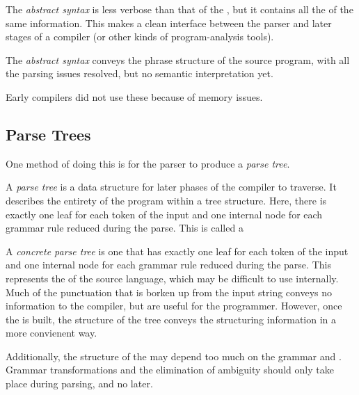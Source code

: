 \begin{definition}\label{def:Abstract_Syntax}
  The \emph{abstract syntax} is less verbose than that of the , but it contains all the of the same information.
  This makes a clean interface between the parser and later stages of a compiler (or other kinds of program-analysis tools).
  
  The \emph{abstract syntax} conveys the phrase structure of the source program, with all the parsing issues resolved, but no semantic interpretation yet.

  Early compilers did not use these because of memory issues.
\end{definition}

\subsection{Parse Trees}\label{subsec:Parse_Trees}
One method of doing this is for the parser to produce a \emph{parse tree}.
\begin{definition}\label{def:Parse_Tree}
  A \emph{parse tree} is a data structure for later phases of the compiler to traverse.
  It describes the entirety of the program within a tree structure.
  Here, there is exactly one leaf for each token of the input and one internal node for each grammar rule reduced during the parse.
  This is called a 
\end{definition}

\begin{definition}\label{def:Concrete_Parse_Tree}
  A \emph{concrete parse tree} is one that has exactly one leaf for each token of the input and one internal node for each grammar rule reduced during the parse.
  This represents the \emph{} of the source language, which may be difficult to use internally.
  Much of the punctuation that is borken up from the input string conveys no information to the compiler, but are useful for the programmer.
  However, once the  is built, the structure of the tree conveys the structuring information in a more convienent way.

  Additionally, the structure of the  may depend too much on the grammar and .
  Grammar transformations and the elimination of ambiguity should only take place during parsing, and no later.
\end{definition}

